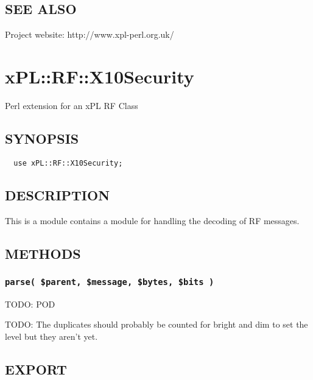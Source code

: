 \subsection*{SEE ALSO\label{xPL::RF::X10_SEE_ALSO}}


Project website: http://www.xpl-perl.org.uk/

\section{xPL::RF::X10Security\label{xPL::RF::X10Security}}


Perl extension for an xPL RF Class

\subsection*{SYNOPSIS\label{xPL::RF::X10Security_SYNOPSIS}}
\begin{verbatim}
  use xPL::RF::X10Security;
\end{verbatim}
\subsection*{DESCRIPTION\label{xPL::RF::X10Security_DESCRIPTION}}


This is a module contains a module for handling the decoding of RF
messages.

\subsection*{METHODS\label{xPL::RF::X10Security_METHODS}}
\subsubsection*{\texttt{parse( \$parent, \$message, \$bytes, \$bits )}\label{xPL::RF::X10Security_parse_parent_message_bytes_bits_}}


TODO: POD



TODO: The duplicates should probably be counted for bright and dim to set
the level but they aren't yet.

\subsection*{EXPORT\label{xPL::RF::X10Security_EXPORT}}


